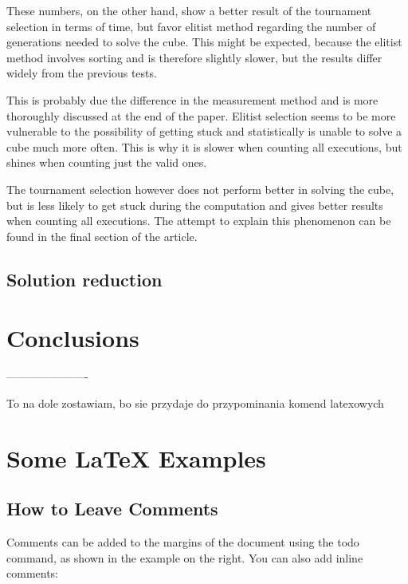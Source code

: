 \documentclass[a4paper]{article}
\begin{document}
These numbers, on the other hand, show a better result of the tournament selection in terms of time, but favor elitist method regarding the number of generations needed to solve the cube. This might be expected, because the elitist method involves sorting and is therefore slightly slower, but the results differ widely from the previous tests.

This is probably due the difference in the measurement method and is more thoroughly discussed at the end of the paper. Elitist selection seems to be more vulnerable to the possibility of getting stuck and statistically is unable to solve a cube much more often. This is why it is slower when counting all executions, but shines when counting just the valid ones.

The tournament selection however does not perform better in solving the cube, but is less likely to get stuck during the computation and gives better results when counting all executions. The attempt to explain this phenomenon can be found in the final section of the article.

\subsection{Solution reduction}


\section{Conclusions}


----------------------

To na dole zostawiam, bo sie przydaje do przypominania komend latexowych



\section{Some \LaTeX{} Examples}
\label{sec:examples}

\subsection{How to Leave Comments}

Comments can be added to the margins of the document using the  todo command, as shown in the example on the right. You can also add inline comments:

\end{document}
